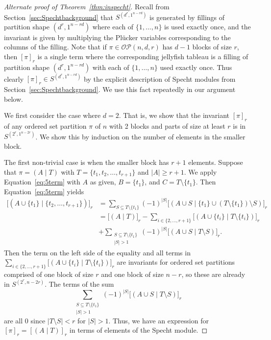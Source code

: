 \documentclass[10pt]{amsart}
\theoremstyle{definition}
\theoremstyle{plain}
\theoremstyle{plain}
\theoremstyle{definition}
\theoremstyle{remark}
\theoremstyle{plain}
\theoremstyle{plain}
\theoremstyle{plain}
\numberwithin{equation}{section}
\newcommand{\ordsetpart}{\mathcal{OP}}
\begin{document}
\begin{proof}[Alternate proof of Theorem~\ref{thm:inspecht}]
Recall from Section~\ref{sec:Spechtbackground} that $S^{(d^r,1^{n- rd})}$ is generated by fillings of partition shape $(d^r,1^{n-r d})$ where each of $\{1,\ldots,n\}$ is used exactly once, and the invariant is given by multiplying the Pl\"ucker variables corresponding to the columns of the filling. Note that if $ \pi \in \ordsetpart(n,d,r)$ has $d-1$ blocks of size $r$, then $[\pi]_r$ is a single term where the corresponding jellyfish tableau is a filling of partition shape $(d^r,1^{n-r d})$ with each of $\{1,\ldots,n\}$ used exactly once. Thus clearly $[\pi]_r\in S^{(d^r,1^{n-r d})}$ by the explicit description of Specht modules from Section~\ref{sec:Spechtbackground}. We use this fact repeatedly in our argument below.

We first consider the case where $d=2$. That is, we show that the invariant $[\pi]_r$ of any ordered set partition $\pi$ of $n$ with 2 blocks and parts of size at least $r$ is in $S^{(2^r,1^{n-2r})}$. We show this by induction on the number of elements in the smaller block.

The first non-trivial case is when the smaller block has $r+1$ elements. Suppose that $\pi=(A \mid T)$ with $T=\{t_1,t_2,\ldots,t_{r+1}\}$ and $|A|\geq r+1$. We apply Equation~\eqref{eq:5term} with $A$ as given, $B=\{t_1\}$, and $C=T\setminus \{t_1\}$. Then Equation~\eqref{eq:5term} yields
\begin{align*}
\big[(A\cup \{t_1\} \mid \{t_2,\ldots,t_{r+1}\})\big]_r&=\sum_{S\subseteq T\setminus \{t_1\}}(-1)^{|S|}\big[(A\cup S \mid \{t_1\}\cup (T\setminus \{t_1\})\setminus S)\big]_r\\
&=\big[(A \mid T)\big]_r-\sum_{i\in\{2,\ldots,r+1\}}\big[(A\cup \{t_i\} \mid T\setminus \{t_i\})\big]_r\\
&+\sum_{\substack{S\subseteq T\setminus \{t_1\} \\ |S|>1}}(-1)^{|S|}\big[(A\cup S \mid T\setminus S)\big]_r.
\end{align*}
Then the term on the left side of the equality and all terms in $\sum_{i\in\{2,\ldots,r+1\}}\big[(A\cup \{t_i\} \mid T\setminus \{t_i\})\big]_r$ are invariants for ordered set partitions comprised of one block of size $r$ and one block of size $n-r$, so these are already in $S^{(2^r, n-2r)}$. The terms of the sum 
\[\sum_{\substack{S\subseteq T\setminus \{t_1\} \\ |S|>1}}(-1)^{|S|}\big[(A\cup S \mid T\setminus S)\big]_r
\]
are all $0$ since $|T\setminus S|<r$ for $|S|>1$. Thus, we have an expression for $[\pi]_r=[(A \mid T)]_r$ in terms of elements of the Specht module. 


\end{proof}
\end{document}

